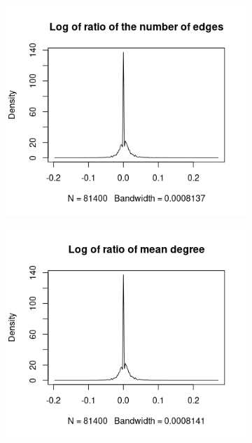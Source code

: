 \documentclass{l4proj}
\theoremstyle{definition}
\theoremstyle{remark}
\begin{document}
\begin{appendices}
  \begin{figure}
    \centering
    \begin{subfigure}[t]{0.49\textwidth}
      \centering
      \includegraphics[width=\textwidth]{images/mcs_ratio_edges.png}
    \end{subfigure}
    \begin{subfigure}[t]{0.49\textwidth}
      \centering
      \includegraphics[width=\textwidth]{images/mcs_ratio_meandeg.png}

\end{subfigure}
\end{figure}
\end{appendices}
\end{document}
